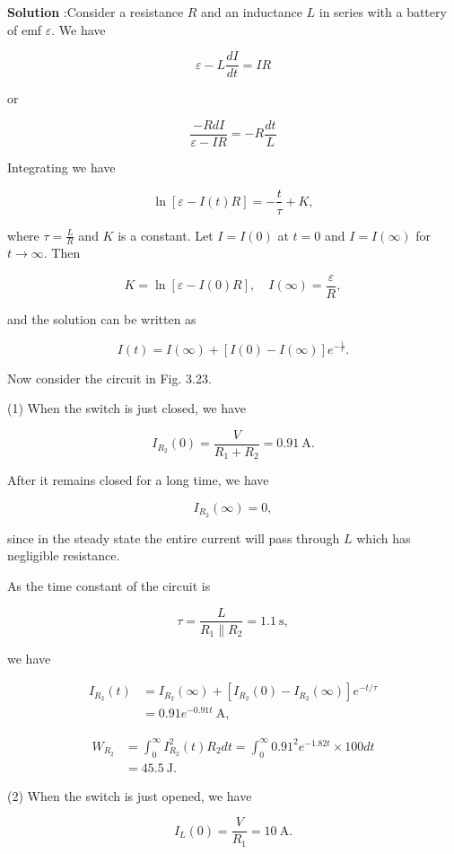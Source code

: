 \documentclass[10pt]{article}
\begin{document}
\textbf{Solution} :Consider a resistance $R$ and an inductance $L$ in series with a battery of emf $\varepsilon$. We have

$$
\varepsilon-L \frac{d I}{d t}=I R
$$

or

$$
\frac{-R d I}{\varepsilon-I R}=-R \frac{d t}{L}
$$

Integrating we have

$$
\ln [\varepsilon-I(t) R]=-\frac{t}{\tau}+K,
$$

where $\tau=\frac{L}{R}$ and $K$ is a constant. Let $I=I(0)$ at $t=0$ and $I=I(\infty)$ for $t \rightarrow \infty$. Then

$$
K=\ln [\varepsilon-I(0) R], \quad I(\infty)=\frac{\varepsilon}{R},
$$

and the solution can be written as

$$
I(t)=I(\infty)+[I(0)-I(\infty)] e^{-\frac{1}{r}} .
$$

Now consider the circuit in Fig. 3.23.

(1) When the switch is just closed, we have

$$
I_{R_{2}}(0)=\frac{V}{R_{1}+R_{2}}=0.91 \mathrm{~A} .
$$

After it remains closed for a long time, we have

$$
I_{R_{2}}(\infty)=0,
$$

since in the steady state the entire current will pass through $L$ which has negligible resistance.

As the time constant of the circuit is

$$
\tau=\frac{L}{R_{1} \| R_{2}}=1.1 \mathrm{~s},
$$

we have

$$
\begin{aligned}
I_{R_{2}}(t) &=I_{R_{2}}(\infty)+\left[I_{R_{2}}(0)-I_{R_{2}}(\infty)\right] e^{-t / \tau} \\
&=0.91 e^{-0.91 t} \mathrm{~A},
\end{aligned}
$$



$$
\begin{aligned}
W_{R_{2}} &=\int_{0}^{\infty} I_{R_{2}}^{2}(t) R_{2} d t=\int_{0}^{\infty} 0.91^{2} e^{-1.82 t} \times 100 d t \\
&=45.5 \mathrm{~J} .
\end{aligned}
$$

(2) When the switch is just opened, we have

$$
I_{L}(0)=\frac{V}{R_{1}}=10 \mathrm{~A} .
$$
\end{document}

